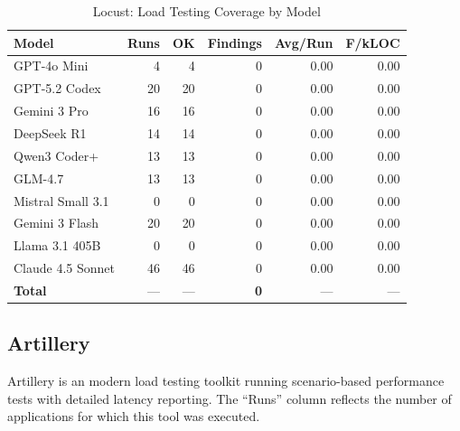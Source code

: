 \begin{table}[htbp]
    \centering
    \caption{Locust: Load Testing Coverage by Model}
    \label{tab:tool_locust}
    \small
    \begin{tabular}{@{} l r r r r r @{}}
        \toprule
        \textbf{Model} & \textbf{Runs} & \textbf{OK} & \textbf{Findings} & \textbf{Avg/Run} & \textbf{F/kLOC} \\
        \midrule
        GPT-4o Mini & 4 & 4 & 0 & 0.00 & 0.00 \\
        GPT-5.2 Codex & 20 & 20 & 0 & 0.00 & 0.00 \\
        Gemini 3 Pro & 16 & 16 & 0 & 0.00 & 0.00 \\
        DeepSeek R1 & 14 & 14 & 0 & 0.00 & 0.00 \\
        Qwen3 Coder+ & 13 & 13 & 0 & 0.00 & 0.00 \\
        GLM-4.7 & 13 & 13 & 0 & 0.00 & 0.00 \\
        Mistral Small 3.1 & 0 & 0 & 0 & 0.00 & 0.00 \\
        Gemini 3 Flash & 20 & 20 & 0 & 0.00 & 0.00 \\
        Llama 3.1 405B & 0 & 0 & 0 & 0.00 & 0.00 \\
        Claude 4.5 Sonnet & 46 & 46 & 0 & 0.00 & 0.00 \\
        \midrule
        \textbf{Total} & --- & --- & \textbf{0} & --- & --- \\
        \bottomrule
    \end{tabular}
\end{table}

\subsection{Artillery}

Artillery is an modern load testing toolkit running scenario-based performance tests with detailed latency reporting. The ``Runs'' column reflects the number of applications for which this tool was executed.

